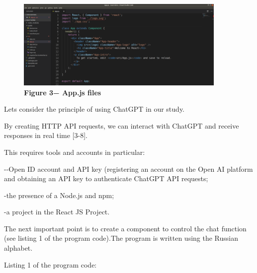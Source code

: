 \begin{figure}[H]
	\centering
	\includegraphics[width=0.9\textwidth]{assets/128}
	\caption*{\bfseries Figure 3− App.js files}
\end{figure}

\begin{multicols}{2}

Let\textquotesingle s consider the principle of using ChatGPT in our
study.

By creating HTTP API requests, we can interact with ChatGPT and receive
responses in real time {[}3-8{]}.
\end{multicols}
\begin{multicols}{2}
This requires tools and accounts in particular:

-\/-Open ID account and API key (registering an account on the Open AI
platform and obtaining an API key to authenticate ChatGPT API requests;

-the presence of a Node.js and npm;

-a project in the React JS Project.
\end{multicols}
\begin{multicols}{2}

The next important point is to create a component to control the chat
function (see listing 1 of the program code).The program is written
using the Russian alphabet.

Listing 1 of the program code:
\end{multicols}

